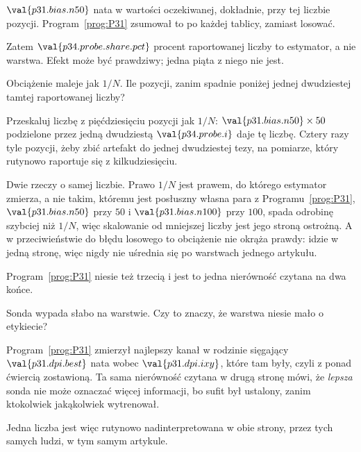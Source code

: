 \begin{fr}
\begin{ansblock}
$\val{p31.bias.n50}$ nata \dash{} w wartości oczekiwanej, dokładnie, przy tej
liczbie pozycji. Program~\ref{prog:P31} zsumował to po każdej tablicy,
zamiast losować.
\end{ansblock}

Zatem $\val{p34.probe.share.pct}$ procent raportowanej liczby to estymator, a
nie warstwa. Efekt może być prawdziwy; jedna piąta z niego nie jest.

Obciążenie maleje jak $1/N$. Ile pozycji, zanim spadnie poniżej jednej
dwudziestej tamtej raportowanej liczby?
\dotline
\nextframe
\end{fr}

\begin{fr}

Przeskaluj liczbę z pięćdziesięciu pozycji jak $1/N$: $\val{p31.bias.n50}
\times 50$ podzielone przez jedną dwudziestą $\val{p34.probe.i}$ daje tę
liczbę. Cztery razy tyle pozycji, żeby zbić artefakt do jednej dwudziestej
tezy, na pomiarze, który rutynowo raportuje się z kilkudziesięciu.

Dwie rzeczy o samej liczbie. Prawo $1/N$ jest prawem, do którego estymator
zmierza, a nie takim, któremu jest posłuszny \dash{} własna para z
Programu~\ref{prog:P31}, $\val{p31.bias.n50}$ przy $50$ i
$\val{p31.bias.n100}$ przy $100$, spada odrobinę szybciej niż $1/N$, więc
skalowanie od mniejszej liczby jest jego stroną ostrożną. A w przeciwieństwie
do błędu losowego to obciążenie nie okrąża prawdy: idzie w jedną stronę, więc
nigdy nie uśrednia się po warstwach jednego artykułu.
\end{fr}

\begin{fr}
Program~\ref{prog:P31} niesie też trzecią i jest to jedna nierówność czytana
na dwa końce.

Sonda wypada słabo na warstwie. Czy to znaczy, że warstwa niesie mało o
etykiecie?
\dotline
\nextframe
\end{fr}

\begin{fr}

Program~\ref{prog:P31} zmierzył najlepszy kanał w rodzinie sięgający
$\val{p31.dpi.best}$ nata wobec $\val{p31.dpi.ixy}$, które tam były, czyli z
ponad ćwiercią zostawioną. Ta sama nierówność czytana w drugą stronę mówi, że
\emph{lepsza} sonda nie może oznaczać więcej informacji, bo sufit był ustalony,
zanim ktokolwiek jakąkolwiek wytrenował.

Jedna liczba jest więc rutynowo nadinterpretowana w obie strony, przez tych
samych ludzi, w tym samym artykule.
\end{fr}

